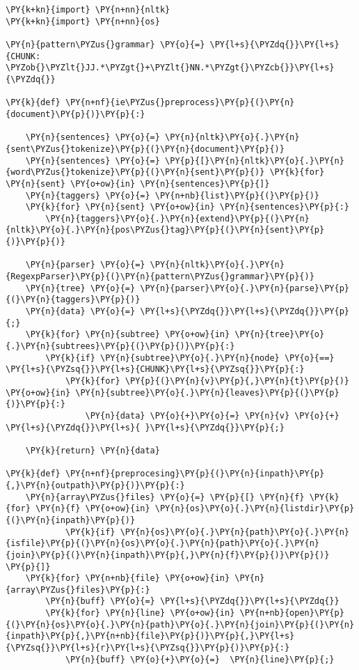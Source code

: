 \begin{Verbatim}[frame=single,commandchars=\\\{\}]
\PY{k+kn}{import} \PY{n+nn}{nltk}
\PY{k+kn}{import} \PY{n+nn}{os}

\PY{n}{pattern\PYZus{}grammar} \PY{o}{=} \PY{l+s}{\PYZdq{}}\PY{l+s}{CHUNK: \PYZob{}\PYZlt{}JJ.*\PYZgt{}+\PYZlt{}NN.*\PYZgt{}\PYZcb{}}\PY{l+s}{\PYZdq{}}

\PY{k}{def} \PY{n+nf}{ie\PYZus{}preprocess}\PY{p}{(}\PY{n}{document}\PY{p}{)}\PY{p}{:}

    \PY{n}{sentences} \PY{o}{=} \PY{n}{nltk}\PY{o}{.}\PY{n}{sent\PYZus{}tokenize}\PY{p}{(}\PY{n}{document}\PY{p}{)}
    \PY{n}{sentences} \PY{o}{=} \PY{p}{[}\PY{n}{nltk}\PY{o}{.}\PY{n}{word\PYZus{}tokenize}\PY{p}{(}\PY{n}{sent}\PY{p}{)} \PY{k}{for} \PY{n}{sent} \PY{o+ow}{in} \PY{n}{sentences}\PY{p}{]}
    \PY{n}{taggers} \PY{o}{=} \PY{n+nb}{list}\PY{p}{(}\PY{p}{)}
    \PY{k}{for} \PY{n}{sent} \PY{o+ow}{in} \PY{n}{sentences}\PY{p}{:}
        \PY{n}{taggers}\PY{o}{.}\PY{n}{extend}\PY{p}{(}\PY{n}{nltk}\PY{o}{.}\PY{n}{pos\PYZus{}tag}\PY{p}{(}\PY{n}{sent}\PY{p}{)}\PY{p}{)}

    \PY{n}{parser} \PY{o}{=} \PY{n}{nltk}\PY{o}{.}\PY{n}{RegexpParser}\PY{p}{(}\PY{n}{pattern\PYZus{}grammar}\PY{p}{)}
    \PY{n}{tree} \PY{o}{=} \PY{n}{parser}\PY{o}{.}\PY{n}{parse}\PY{p}{(}\PY{n}{taggers}\PY{p}{)}
    \PY{n}{data} \PY{o}{=} \PY{l+s}{\PYZdq{}}\PY{l+s}{\PYZdq{}}\PY{p}{;}
    \PY{k}{for} \PY{n}{subtree} \PY{o+ow}{in} \PY{n}{tree}\PY{o}{.}\PY{n}{subtrees}\PY{p}{(}\PY{p}{)}\PY{p}{:}
        \PY{k}{if} \PY{n}{subtree}\PY{o}{.}\PY{n}{node} \PY{o}{==} \PY{l+s}{\PYZsq{}}\PY{l+s}{CHUNK}\PY{l+s}{\PYZsq{}}\PY{p}{:}
            \PY{k}{for} \PY{p}{(}\PY{n}{v}\PY{p}{,}\PY{n}{t}\PY{p}{)} \PY{o+ow}{in} \PY{n}{subtree}\PY{o}{.}\PY{n}{leaves}\PY{p}{(}\PY{p}{)}\PY{p}{:}
                \PY{n}{data} \PY{o}{+}\PY{o}{=} \PY{n}{v} \PY{o}{+} \PY{l+s}{\PYZdq{}}\PY{l+s}{ }\PY{l+s}{\PYZdq{}}\PY{p}{;}

    \PY{k}{return} \PY{n}{data}

\PY{k}{def} \PY{n+nf}{preprocesing}\PY{p}{(}\PY{n}{inpath}\PY{p}{,}\PY{n}{outpath}\PY{p}{)}\PY{p}{:}
    \PY{n}{array\PYZus{}files} \PY{o}{=} \PY{p}{[} \PY{n}{f} \PY{k}{for} \PY{n}{f} \PY{o+ow}{in} \PY{n}{os}\PY{o}{.}\PY{n}{listdir}\PY{p}{(}\PY{n}{inpath}\PY{p}{)} 
            \PY{k}{if} \PY{n}{os}\PY{o}{.}\PY{n}{path}\PY{o}{.}\PY{n}{isfile}\PY{p}{(}\PY{n}{os}\PY{o}{.}\PY{n}{path}\PY{o}{.}\PY{n}{join}\PY{p}{(}\PY{n}{inpath}\PY{p}{,}\PY{n}{f}\PY{p}{)}\PY{p}{)} \PY{p}{]}
    \PY{k}{for} \PY{n+nb}{file} \PY{o+ow}{in} \PY{n}{array\PYZus{}files}\PY{p}{:}
        \PY{n}{buff} \PY{o}{=} \PY{l+s}{\PYZdq{}}\PY{l+s}{\PYZdq{}}
        \PY{k}{for} \PY{n}{line} \PY{o+ow}{in} \PY{n+nb}{open}\PY{p}{(}\PY{n}{os}\PY{o}{.}\PY{n}{path}\PY{o}{.}\PY{n}{join}\PY{p}{(}\PY{n}{inpath}\PY{p}{,}\PY{n+nb}{file}\PY{p}{)}\PY{p}{,}\PY{l+s}{\PYZsq{}}\PY{l+s}{r}\PY{l+s}{\PYZsq{}}\PY{p}{)}\PY{p}{:}
            \PY{n}{buff} \PY{o}{+}\PY{o}{=}  \PY{n}{line}\PY{p}{;}


\end{Verbatim}

